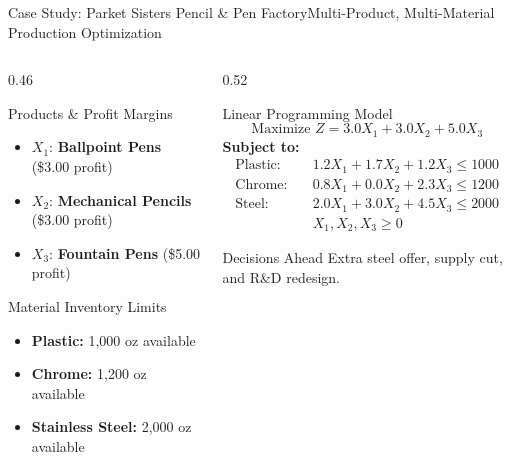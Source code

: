 \documentclass{beamer}
\begin{document}
\begin{frame}{Case Study: Parket Sisters Pencil \& Pen Factory}{Multi-Product, Multi-Material Production Optimization}
    \begin{columns}[T]
        \begin{column}{0.46\textwidth}
            \begin{block}{Products \& Profit Margins}
                \begin{itemize}\setlength{\itemsep}{0.2em}
                    \item $X_1$: \textbf{Ballpoint Pens} (\$3.00 profit)
                    \item $X_2$: \textbf{Mechanical Pencils} (\$3.00 profit)
                    \item $X_3$: \textbf{Fountain Pens} (\$5.00 profit)
                \end{itemize}
            \end{block}
            \begin{block}{Material Inventory Limits}
                \begin{itemize}\setlength{\itemsep}{0.2em}
                    \item \textbf{Plastic:} 1,000 oz available
                    \item \textbf{Chrome:} 1,200 oz available
                    \item \textbf{Stainless Steel:} 2,000 oz available
                \end{itemize}
            \end{block}
        \end{column}
        \begin{column}{0.52\textwidth}
            \begin{exampleblock}{Linear Programming Model}
                \footnotesize
                \[ \text{Maximize } Z = 3.0 X_1 + 3.0 X_2 + 5.0 X_3 \]
                \textbf{Subject to:}
                \begin{align*}
                \text{Plastic:}\quad  & 1.2 X_1 + 1.7 X_2 + 1.2 X_3 \le 1000 \\
                \text{Chrome:}\quad   & 0.8 X_1 + 0.0 X_2 + 2.3 X_3 \le 1200 \\
                \text{Steel:}\quad    & 2.0 X_1 + 3.0 X_2 + 4.5 X_3 \le 2000 \\
                & X_1, X_2, X_3 \ge 0
                \end{align*}
            \end{exampleblock}
            \vspace{-0.3em}
            \begin{alertblock}{Decisions Ahead}
                \scriptsize Extra steel offer, supply cut, and R\&D redesign.
            \end{alertblock}
        \end{column}
    \end{columns}
\end{frame}
\end{document}

